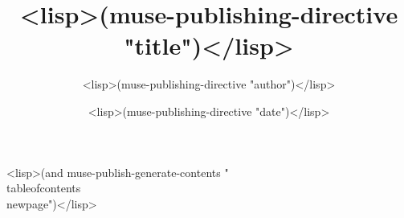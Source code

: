 \documentclass{article}
\begin{document}
\title{<lisp>(muse-publishing-directive "title")</lisp>}
\author{<lisp>(muse-publishing-directive "author")</lisp>}
\date{<lisp>(muse-publishing-directive "date")</lisp>}

\maketitle

<lisp>(and muse-publish-generate-contents
           "\\tableofcontents
\\newpage")</lisp>
\end{document}
